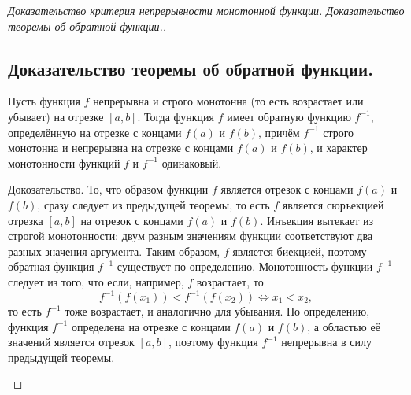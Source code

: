 \begin{proof}[Доказательство критерия непрерывности монотонной функции. Доказательство теоремы об обратной функции.]
    \subsection*{Доказательство теоремы об обратной функции.}
    \begin{note}[amber]
        Пусть функция $f$ непрерывна и строго монотонна (то есть возрастает или убывает) на отрезке $[a,b]$. Тогда функция $f$ имеет обратную функцию $f^{-1}$, определённую на отрезке с концами $f(a)$ и $f(b)$, 
        причём $f^{-1}$ строго монотонна и непрерывна на отрезке с концами $f(a)$ и $f(b)$, и характер монотонности функций $f$ и $f^{-1}$ одинаковый.\\
        \begin{note}[purple]
           Докозательство. То, что образом функции $f$ является отрезок с концами $f(a)$ и $f(b)$, сразу следует из предыдущей теоремы, то есть $f$ является сюръекцией отрезка $[a,b]$ на отрезок с концами $f(a)$ и $f(b)$.
           Инъекция вытекает из строгой монотонности: двум разным значениям функции соответствуют два разных значения аргумента. Таким образом, $f$ является биекцией, поэтому обратная функция $f^{-1}$ существует по определению.
           Монотонность функции $f^{-1}$ следует из того, что если, например, $f$ возрастает, то
           \[
           f^{-1}(f(x_1)) < f^{-1}(f(x_2)) \iff x_1 < x_2,
           \]
           то есть $f^{-1}$ тоже возрастает, и аналогично для убывания.
           По определению, функция $f^{-1}$ определена на отрезке с концами $f(a)$ и $f(b)$, а областью её значений является отрезок $[a,b]$, поэтому функция $f^{-1}$ непрерывна в силу предыдущей теоремы.
        \end{note}
    \end{note}
\end{proof}
